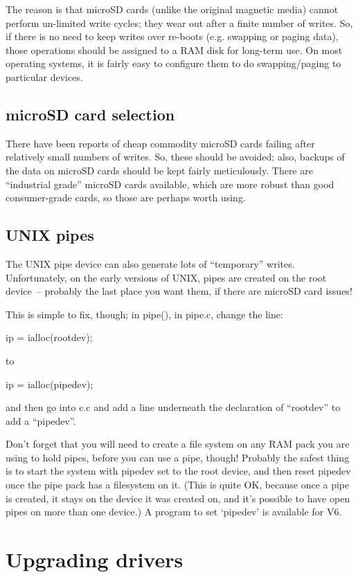 The reason is that microSD cards (unlike the original magnetic media) cannot
perform un-limited write cycles; they wear out after a finite number of
writes. So, if there is no need to keep writes over re-boots (e.g. swapping
or paging data), those operations should be assigned to a RAM disk for
long-term use. On most operating systems, it is fairly easy to configure them
to do swapping/paging to particular devices.

\subsection{microSD card selection}

There have been reports of cheap commodity microSD cards failing after relatively
small numbers of writes. So, these should be avoided; also, backups of the
data on microSD cards should be kept fairly meticulously. There are ``industrial
grade'' microSD cards available, which are more robust than good consumer-grade
cards, so those are perhaps worth using.

\subsection{UNIX pipes}

The UNIX pipe device can also generate lots of ``temporary'' writes.
Unfortunately, on the early versions of UNIX, pipes are created on the root
device~-- probably the last place you want them, if there are microSD card issues!

This is simple to fix, though; in pipe(), in pipe.c, change the line:

	ip = ialloc(rootdev);

to

	ip = ialloc(pipedev);

and then go into c.c and add a line underneath the declaration of ``rootdev''
to add a ``pipedev''.

Don't forget that you will need to create a file system on any RAM pack you
are using to hold pipes, before you can use a pipe, though! Probably the
safest thing is to start the system with pipedev set to the root device, and
then reset pipedev once the pipe pack has a filesystem on it. (This is quite
OK, because once a pipe is created, it stays on the device it was created on,
and it's possible to have open pipes on more than one device.) A program to
set `pipedev' is available for V6.

\section{Upgrading drivers}

